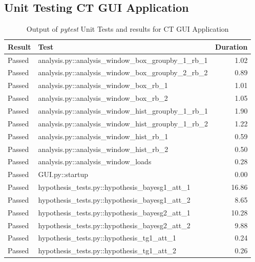 \documentclass[11pt]{report}
\begin{document}
\subsection{Unit Testing CT GUI Application}
\label{sec-2-9-3}

\begin{table}[htb]
\caption{\label{tab:unittest2}Output of \emph{pytest} Unit Tests and results for CT GUI Application}
\centering
\begin{tabularx}{\textwidth}{|l|X|r|}
\hline
Result & Test & Duration\\
\hline
\color{ForestGreen}Passed & analysis.py::analysis\_window\_box\_groupby\_1\_rb\_1 & 1.02\\
\hline
\color{ForestGreen}Passed & analysis.py::analysis\_window\_box\_groupby\_2\_rb\_2 & 0.89\\
\hline
\color{ForestGreen}Passed & analysis.py::analysis\_window\_box\_rb\_1 & 1.01\\
\hline
\color{ForestGreen}Passed & analysis.py::analysis\_window\_box\_rb\_2 & 1.05\\
\hline
\color{ForestGreen}Passed & analysis.py::analysis\_window\_hist\_groupby\_1\_rb\_1 & 1.90\\
\hline
\color{ForestGreen}Passed & analysis.py::analysis\_window\_hist\_groupby\_1\_rb\_2 & 1.22\\
\hline
\color{ForestGreen}Passed & analysis.py::analysis\_window\_hist\_rb\_1 & 0.59\\
\hline
\color{ForestGreen}Passed & analysis.py::analysis\_window\_hist\_rb\_2 & 0.50\\
\hline
\color{ForestGreen}Passed & analysis.py::analysis\_window\_loads & 0.28\\
\hline
\color{ForestGreen}Passed & GUI.py::startup & 0.00\\
\hline
\color{ForestGreen}Passed & hypothesis\_tests.py::hypothesis\_bayesg1\_att\_1 & 16.86\\
\hline
\color{ForestGreen}Passed & hypothesis\_tests.py::hypothesis\_bayesg1\_att\_2 & 8.65\\
\hline
\color{ForestGreen}Passed & hypothesis\_tests.py::hypothesis\_bayesg2\_att\_1 & 10.28\\
\hline
\color{ForestGreen}Passed & hypothesis\_tests.py::hypothesis\_bayesg2\_att\_2 & 9.88\\
\hline
\color{ForestGreen}Passed & hypothesis\_tests.py::hypothesis\_tg1\_att\_1 & 0.24\\
\hline
\color{ForestGreen}Passed & hypothesis\_tests.py::hypothesis\_tg1\_att\_2 & 0.26\\

\end{tabularx}
\end{table}
\end{document}
